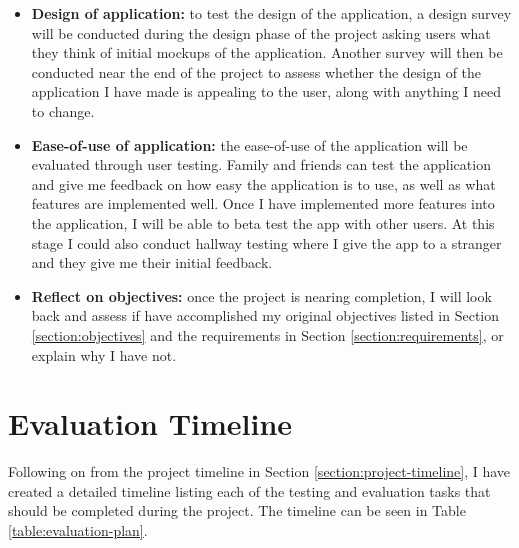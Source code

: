 \begin{itemize}
  \item \textbf{Design of application:} to test the design of the application, a design survey will be conducted during the design phase of the project asking users what they think of initial mockups of the application. Another survey will then be conducted near the end of the project to assess whether the design of the application I have made is appealing to the user, along with anything I need to change.
  \item \textbf{Ease-of-use of application:} the ease-of-use of the application will be evaluated through user testing. Family and friends can test the application and give me feedback on how easy the application is to use, as well as what features are implemented well. Once I have implemented more features into the application, I will be able to beta test the app with other users. At this stage I could also conduct hallway testing where I give the app to a stranger and they give me their initial feedback.
  \item \textbf{Reflect on objectives:} once the project is nearing completion, I will look back and assess if have accomplished my original objectives listed in Section \ref{section:objectives} and the requirements in Section \ref{section:requirements}, or explain why I have not.
\end{itemize}

\section{Evaluation Timeline}

Following on from the project timeline in Section \ref{section:project-timeline}, I have created a detailed timeline listing each of the testing and evaluation tasks that should be completed during the project. The timeline can be seen in Table \ref{table:evaluation-plan}.

